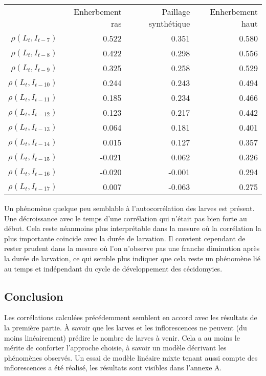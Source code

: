 \documentclass[a4paper, 11pt]{article}
\begin{document}
\begin{center}
\begin{tabular}{rrrr}
 & Enherbement ras & Paillage synthétique & Enherbement haut \\
$\rho\left( L_t, I_{t-7} \right)    $ & 0.522& 0.351& 0.580 \\
$\rho\left( L_t, I_{t-8} \right)    $ & 0.422& 0.298& 0.556  \\
$\rho\left( L_t, I_{t-9} \right)    $ & 0.325& 0.258& 0.529   \\
$\rho\left( L_t, I_{t-10} \right)    $& 0.244& 0.243& 0.494    \\
$\rho\left( L_t, I_{t-11} \right)    $& 0.185& 0.234& 0.466     \\
$\rho\left( L_t, I_{t-12} \right)    $& 0.123& 0.217& 0.442      \\
$\rho\left( L_t, I_{t-13} \right)    $& 0.064& 0.181& 0.401       \\
$\rho\left( L_t, I_{t-14} \right)    $& 0.015& 0.127& 0.357      \\
$\rho\left( L_t, I_{t-15} \right)    $& -0.021&  0.062&  0.326    \\
$\rho\left( L_t, I_{t-16} \right)    $& -0.020& -0.001&  0.294  \\
$\rho\left( L_t, I_{t-17} \right)    $&  0.007& -0.063& 0.275
\end{tabular}
\end{center}


Un phénomène quelque peu semblable à l'autocorrélation des larves est présent. Une décroissance avec le temps d'une corrélation qui n'était pas bien forte au début. Cela reste néanmoins plus interprétable dans la mesure où la corrélation la plus importante coïncide avec la durée de larvation. Il convient cependant de rester prudent dans la mesure où l'on n'observe pas une franche diminution après la durée de larvation, ce qui semble plus indiquer que cela reste un phénomène lié au temps et indépendant du cycle de développement des cécidomyies.


\subsection{Conclusion}

Les corrélations calculées précédemment semblent en accord avec les résultats de la première partie. À savoir que les larves et les inflorescences ne peuvent (du moins linéairement) prédire le nombre de larves à venir. Cela a au moins le mérite de conforter l'approche choisie, à savoir un modèle décrivant les phénomènes observés. Un essai de modèle linéaire mixte tenant aussi compte des inflorescences a été réalisé, les résultats sont visibles dans l'annexe A.
\end{document}
